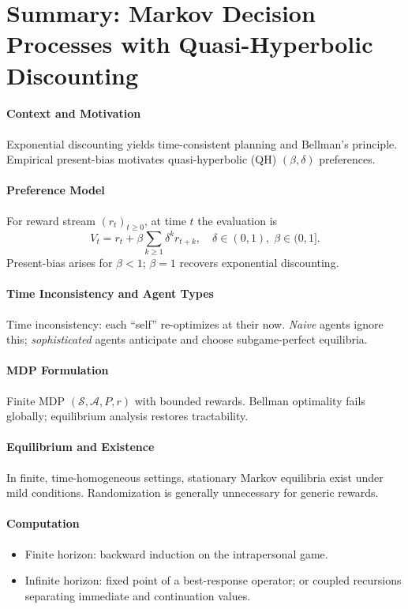 
\section*{Summary: Markov Decision Processes with Quasi-Hyperbolic Discounting}

\paragraph{Context and Motivation}
Exponential discounting yields time-consistent planning and Bellman's principle. Empirical present-bias motivates quasi-hyperbolic (QH) $(\beta,\delta)$ preferences.

\paragraph{Preference Model}
For reward stream $(r_t)_{t\ge0}$, at time $t$ the evaluation is
\[
  V_t = r_t + \beta \sum_{k\ge1} \delta^k r_{t+k},\quad \delta\in(0,1),\; \beta\in(0,1].
\]
Present-bias arises for $\beta<1$; $\beta=1$ recovers exponential discounting.

\paragraph{Time Inconsistency and Agent Types}
Time inconsistency: each ``self'' re-optimizes at their now. \emph{Naive} agents ignore this; \emph{sophisticated} agents anticipate and choose subgame-perfect equilibria.

\paragraph{MDP Formulation}
Finite MDP $(\mathcal{S},\mathcal{A},P,r)$ with bounded rewards. Bellman optimality fails globally; equilibrium analysis restores tractability.

\paragraph{Equilibrium and Existence}
In finite, time-homogeneous settings, stationary Markov equilibria exist under mild conditions. Randomization is generally unnecessary for generic rewards.

\paragraph{Computation}
\begin{itemize}
  \item Finite horizon: backward induction on the intrapersonal game.
  \item Infinite horizon: fixed point of a best-response operator; or coupled recursions separating immediate and continuation values.
\end{itemize}

